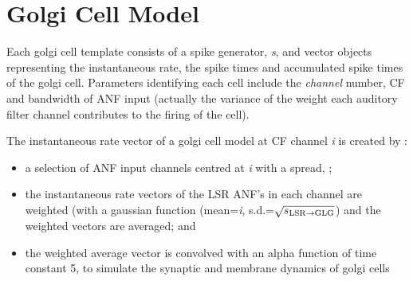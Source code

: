 \section{Golgi Cell Model}

 Each golgi cell template consists of a
spike generator, \emph{s}, and vector objects representing the instantaneous
rate, the spike times and accumulated spike times of the golgi cell. Parameters
identifying each cell include the \emph{channel} number, CF and bandwidth of ANF
input (actually the variance of the weight each auditory filter channel
contributes to the firing of the cell).

The instantaneous rate vector of a golgi cell model at CF channel \emph{i} is
created by :
\begin{itemize}
\item a selection of ANF input channels centred at \emph{i} with a spread,
  \sLSRGLG;
\item the instantaneous rate vectors of the LSR ANF's in each channel are
  weighted (with a gaussian function (mean=\emph{i}, s.d.=$\sqrt{\protect s_{\protect\textrm{{LSR}}\to\textrm{{GLG}}}}$) and
  the weighted vectors are averaged; and
\item the weighted average vector is convolved with an alpha function of time
  constant 5, to simulate the synaptic and membrane dynamics of golgi cells
\end{itemize}

 \medskip{}

